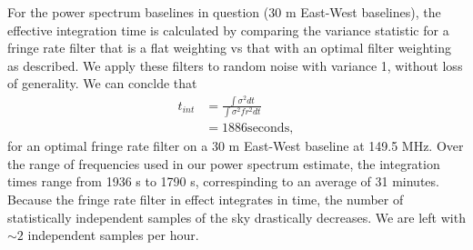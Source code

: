 \documentclass[twocolumn,numberedappendix]{emulateapj} \shorttitle{PSA64}
\begin{document}
For the power spectrum baselines in question (30 m East-West baselines), the
effective integration time is calculated by comparing the variance statistic for
a fringe rate filter that is a flat weighting vs that with an optimal filter
weighting as described. We apply these filters to random noise with variance 1,
without loss of generality. We can conclde that 
\begin{align}
    t_{int} &= \frac{\int{\sigma^{2}dt}}{\int{\sigma^{2}fr^{2}dt}}\\
            &= 1886 \text{seconds},
\end{align}
for an optimal fringe rate filter on a 30 m East-West baseline at 149.5 MHz.
Over the range of frequencies used in our power spectrum estimate, the
integration times range from 1936 s to 1790 s, correspinding to an average of 31
minutes. Because the fringe rate filter in effect integrates in time, the number
of statistically independent samples of the sky drastically decreases. We are
left with $\sim2$ independent samples per hour.



\end{document}
